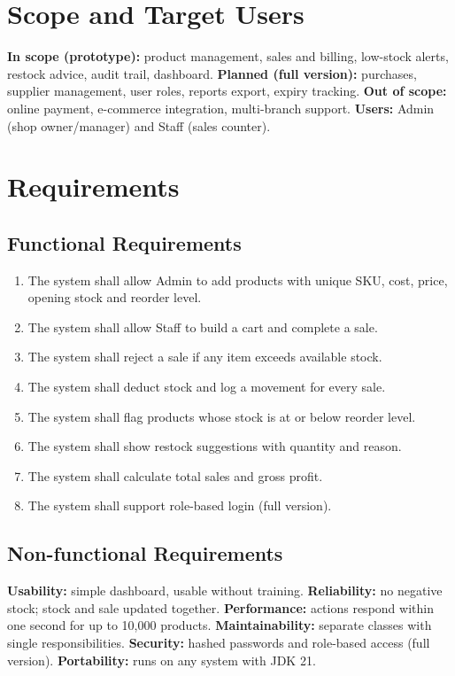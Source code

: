\documentclass[11pt,a4paper]{article}
\begin{document}
\section{Scope and Target Users}
\textbf{In scope (prototype):} product management, sales and billing, low-stock alerts, restock advice, audit trail, dashboard. \textbf{Planned (full version):} purchases, supplier management, user roles, reports export, expiry tracking. \textbf{Out of scope:} online payment, e-commerce integration, multi-branch support. \textbf{Users:} Admin (shop owner/manager) and Staff (sales counter).

\section{Requirements}
\subsection{Functional Requirements}
\begin{enumerate}[noitemsep,label=FR\arabic*.]
\item The system shall allow Admin to add products with unique SKU, cost, price, opening stock and reorder level.
\item The system shall allow Staff to build a cart and complete a sale.
\item The system shall reject a sale if any item exceeds available stock.
\item The system shall deduct stock and log a movement for every sale.
\item The system shall flag products whose stock is at or below reorder level.
\item The system shall show restock suggestions with quantity and reason.
\item The system shall calculate total sales and gross profit.
\item The system shall support role-based login (full version).
\end{enumerate}
\subsection{Non-functional Requirements}
\textbf{Usability:} simple dashboard, usable without training. \textbf{Reliability:} no negative stock; stock and sale updated together. \textbf{Performance:} actions respond within one second for up to 10,000 products. \textbf{Maintainability:} separate classes with single responsibilities. \textbf{Security:} hashed passwords and role-based access (full version). \textbf{Portability:} runs on any system with JDK 21.
\end{document}
